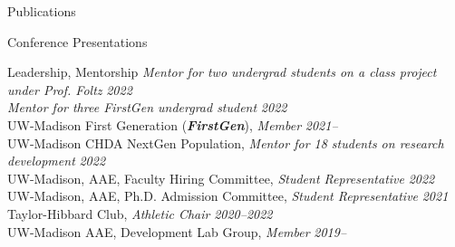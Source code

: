 \documentclass{resume} %
\begin{document}
\begin{rSection}{Publications}
\begin{rSection}{Conference Presentations}
	
	
	
	
	
	
\end{rSection}
	
\begin{rSection}{Leadership, Mentorship}%
\textit{Mentor for two undergrad students on a class project under Prof. Foltz} {\hfill\textit{2022}}\\ 
\textit{Mentor for three FirstGen undergrad student} {\hfill\textit{2022}}\\
UW-Madison First Generation (\textbf{\textit{FirstGen}}), \textit{Member} {\hfill\textit{ 2021--}}\\
UW-Madison CHDA NextGen Population, \textit{Mentor for 18 students on research development} {\hfill\textit{2022}}\\
UW-Madison, AAE, Faculty Hiring Committee, \textit{Student Representative} {\hfill \textit{2022}}\\
UW-Madison, AAE, Ph.D. Admission Committee, \textit{Student Representative} {\hfill \textit{2021}}\\
Taylor-Hibbard Club, \textit{Athletic Chair} {\hfill \textit{2020--2022}} \\
UW-Madison AAE, Development Lab Group, \textit{Member} {\hfill \textit{2019--}}
\end{rSection}




\end{rSection}
\end{document}

